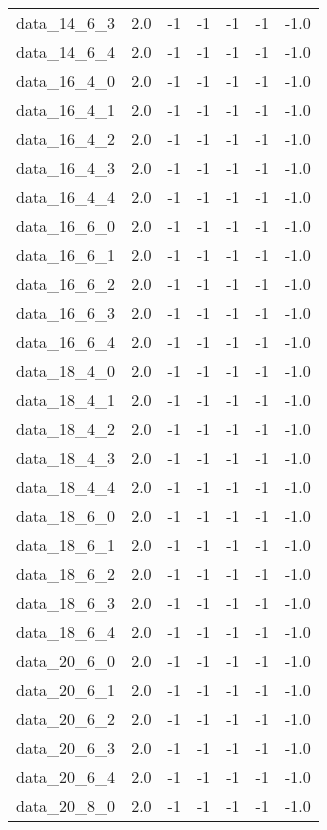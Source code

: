 \begin{tabular}{rrrrrrr}
  data\_14\_6\_3 & 2.0 & -1 & -1 & -1 & -1 & -1.0 \\
  data\_14\_6\_4 & 2.0 & -1 & -1 & -1 & -1 & -1.0 \\
  data\_16\_4\_0 & 2.0 & -1 & -1 & -1 & -1 & -1.0 \\
  data\_16\_4\_1 & 2.0 & -1 & -1 & -1 & -1 & -1.0 \\
  data\_16\_4\_2 & 2.0 & -1 & -1 & -1 & -1 & -1.0 \\
  data\_16\_4\_3 & 2.0 & -1 & -1 & -1 & -1 & -1.0 \\
  data\_16\_4\_4 & 2.0 & -1 & -1 & -1 & -1 & -1.0 \\
  data\_16\_6\_0 & 2.0 & -1 & -1 & -1 & -1 & -1.0 \\
  data\_16\_6\_1 & 2.0 & -1 & -1 & -1 & -1 & -1.0 \\
  data\_16\_6\_2 & 2.0 & -1 & -1 & -1 & -1 & -1.0 \\
  data\_16\_6\_3 & 2.0 & -1 & -1 & -1 & -1 & -1.0 \\
  data\_16\_6\_4 & 2.0 & -1 & -1 & -1 & -1 & -1.0 \\
  data\_18\_4\_0 & 2.0 & -1 & -1 & -1 & -1 & -1.0 \\
  data\_18\_4\_1 & 2.0 & -1 & -1 & -1 & -1 & -1.0 \\
  data\_18\_4\_2 & 2.0 & -1 & -1 & -1 & -1 & -1.0 \\
  data\_18\_4\_3 & 2.0 & -1 & -1 & -1 & -1 & -1.0 \\
  data\_18\_4\_4 & 2.0 & -1 & -1 & -1 & -1 & -1.0 \\
  data\_18\_6\_0 & 2.0 & -1 & -1 & -1 & -1 & -1.0 \\
  data\_18\_6\_1 & 2.0 & -1 & -1 & -1 & -1 & -1.0 \\
  data\_18\_6\_2 & 2.0 & -1 & -1 & -1 & -1 & -1.0 \\
  data\_18\_6\_3 & 2.0 & -1 & -1 & -1 & -1 & -1.0 \\
  data\_18\_6\_4 & 2.0 & -1 & -1 & -1 & -1 & -1.0 \\
  data\_20\_6\_0 & 2.0 & -1 & -1 & -1 & -1 & -1.0 \\
  data\_20\_6\_1 & 2.0 & -1 & -1 & -1 & -1 & -1.0 \\
  data\_20\_6\_2 & 2.0 & -1 & -1 & -1 & -1 & -1.0 \\
  data\_20\_6\_3 & 2.0 & -1 & -1 & -1 & -1 & -1.0 \\
  data\_20\_6\_4 & 2.0 & -1 & -1 & -1 & -1 & -1.0 \\
  data\_20\_8\_0 & 2.0 & -1 & -1 & -1 & -1 & -1.0 \\

\end{tabular}
